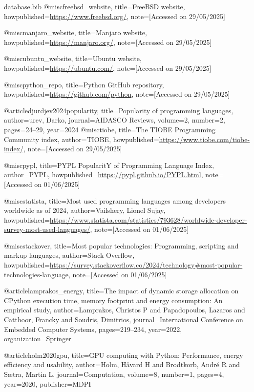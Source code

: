 \begin{filecontents*}{database.bib}
@misc{freebsd_website,
  title={FreeBSD website},
  howpublished={\url{https://www.freebsd.org/}},
  note={[Accessed on 29/05/2025]}
}

@misc{manjaro_website,
  title={Manjaro website},
  howpublished={\url{https://manjaro.org/}},
  note={[Accessed on 29/05/2025]}
}

@misc{ubuntu_website,
  title={Ubuntu website},
  howpublished={\url{https://ubuntu.com/}},
  note={[Accessed on 29/05/2025]}
}

@misc{python_repo,
  title={Python GitHub repository},
  howpublished={\url{https://github.com/python}},
  note={[Accessed on 29/05/2025]}
}

@article{djurdjev2024popularity,
  title={Popularity of programming languages},
  author={{\DJ}ur{\dj}ev, Darko},
  journal={AIDASCO Reviews},
  volume={2},
  number={2},
  pages={24--29},
  year={2024}
}
@misc{tiobe,
  title={The TIOBE Programming Community index},
  author={TIOBE},
  howpublished={\url{https://www.tiobe.com/tiobe-index/}},
  note={[Accessed on 29/05/2025]}
}

@misc{pypl,
  title={PYPL PopularitY of Programming Language Index},
  author={PYPL},
  howpublished={\url{https://pypl.github.io/PYPL.html}},
  note={[Accessed on 01/06/2025]}
}

@misc{statista,
  title={Most used programming languages among developers worldwide as of 2024},
  author={Vailshery, Lionel Sujay},
  howpublished={\url{https://www.statista.com/statistics/793628/worldwide-developer-survey-most-used-languages/}},
  note={[Accessed on 01/06/2025]}
}

@misc{stackover,
  title={Most popular technologies: Programming, scripting and markup languages},
  author={Stack Overflow},
  howpublished={\url{https://survey.stackoverflow.co/2024/technology#most-popular-technologies-language}},
  note={[Accessed on 01/06/2025]}
}

@article{lamprakos_energy,
  title={The impact of dynamic storage allocation on CPython execution time, memory footprint and energy consumption: An empirical study},
  author={Lamprakos, Christos P and Papadopoulos, Lazaros and Catthoor, Francky and Soudris, Dimitrios},
  journal={International Conference on Embedded Computer Systems},
  pages={219--234},
  year={2022},
  organization={Springer}
}

@article{holm2020gpu,
  title={GPU computing with Python: Performance, energy efficiency and usability},
  author={Holm, H{\aa}vard H and Brodtkorb, Andr{\'e} R and S{\ae}tra, Martin L},
  journal={Computation},
  volume={8},
  number={1},
  pages={4},
  year={2020},
  publisher={MDPI}
}


\end{filecontents*}
